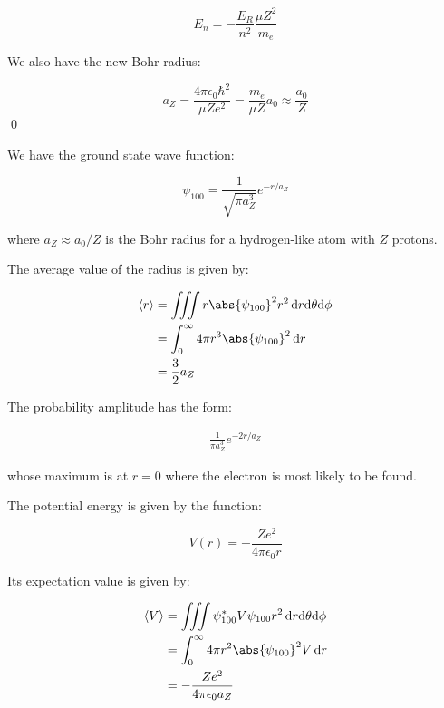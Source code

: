 \documentclass[12pt]{article}
\begin{document}
\begin{equation}
    E_{n} = - \frac{E_{R}}{n^{2}} \frac{\mu Z^{2}}{m_{e}}
\end{equation}

We also have the new Bohr radius:

\begin{equation}
    a_{Z} = \frac{4 \pi \epsilon_{0} \hbar^{2}}{\mu Z e^{2}} = \frac{m_{e}}{\mu Z} a_{0} \approx \frac{a_{0}}{Z}
\end{equation}
\qed


We have the ground state wave function:

\begin{equation}
    \psi_{100} = \frac{1}{\sqrt{\pi a_{Z}^{3}}} e^{-r/a_{Z}}
\end{equation}

where $a_{Z} \approx a_{0}/Z$ is the Bohr radius for a hydrogen-like atom with $Z$ protons.

The average value of the radius is given by:

\begin{equation}
    \begin{split}
        \left\langle r \right\rangle &= \iiint r \abs{\psi_{100}}^{2} r^{2} \, \mathrm{d}r \mathrm{d}\theta \mathrm{d}\phi \\
        &= \int_{0}^{\infty} 4 \pi r^{3} \abs{\psi_{100}}^{2} \, \mathrm{d}r \\
        &= \frac{3}{2} a_{Z}
    \end{split}
\end{equation}

The probability amplitude has the form:

\begin{equation}
    \begin{split}
        \frac{1}{\pi a_{Z}^{3}} e^{-2r/a_{Z}}
    \end{split}
\end{equation}

whose maximum is at $r = 0$ where the electron is most likely to be found.

The potential energy is given by the function:

\begin{equation}
    V(r) = - \frac{Ze^{2}}{4 \pi \epsilon_{0} r}
\end{equation}

Its expectation value is given by:

\begin{equation}
    \begin{split}
        \left\langle V \right\rangle &= \iiint \psi_{100}^{*} V \psi_{100} r^{2} \, \mathrm{d}r \mathrm{d}\theta \mathrm{d}\phi \\
        &= \int_{0}^{\infty} 4 \pi r^{2} \abs{\psi_{100}}^{2} V \, \mathrm{d}r \\
        &= - \frac{Ze^{2}}{4 \pi \epsilon_{0} a_{Z}}
    \end{split}
\end{equation}
\end{document}
